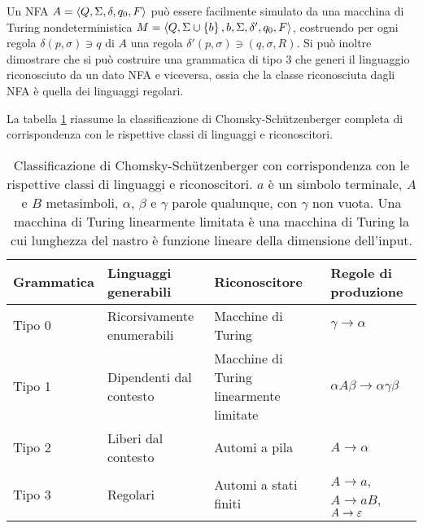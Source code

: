 Un NFA $A=\langle Q,\Sigma,\delta,q_0,F \rangle$ può essere facilmente simulato da una macchina di Turing nondeterministica $M=\langle Q,\Sigma\cup\left\{ b \right\},b,\Sigma,\delta',q_0,F \rangle$, costruendo per ogni regola $\delta(p,\sigma)\ni q$ di $A$ una regola $\delta'(p,\sigma)\ni (q,\sigma,R)$. Si può inoltre dimostrare che si può costruire una grammatica di tipo 3 che generi il linguaggio riconosciuto da un dato NFA e viceversa, ossia che la classe riconosciuta dagli NFA è quella dei linguaggi regolari.

La tabella \ref{tab:prel:chomskyhier} riassume la classificazione di Chomsky-Schützenberger completa di corrispondenza con le rispettive classi di linguaggi e riconoscitori.

\begin{table}
	\caption{Classificazione di Chomsky-Schützenberger con corrispondenza con le rispettive classi di linguaggi e riconoscitori. $a$ è un simbolo terminale, $A$ e $B$ metasimboli, $\alpha$, $\beta$ e $\gamma$ parole qualunque, con $\gamma$ non vuota. Una macchina di Turing linearmente limitata è una macchina di Turing la cui lunghezza del nastro è funzione lineare della dimensione dell'input.}
	\label{tab:prel:chomskyhier}
	\centering
	\begin{tabularx}{\textwidth}{lXXl}
		\toprule
		\textbf{Grammatica} & \textbf{Linguaggi generabili} & \textbf{Riconoscitore}                  & \textbf{Regole di produzione}         \\
		\midrule
		Tipo 0              & Ricorsivamente enumerabili    & Macchine di Turing                      & $\gamma\to\alpha$                     \\
		Tipo 1              & Dipendenti dal contesto       & Macchine di Turing linearmente limitate & $\alpha A\beta\to\alpha\gamma\beta$   \\
		Tipo 2              & Liberi dal contesto           & Automi a pila                           & $A\to\alpha$                          \\
		Tipo 3              & Regolari                      & Automi a stati finiti                   & $A\to a$, $A\to aB$, $A\to\varepsilon$ \\
		\bottomrule
	\end{tabularx}
\end{table}

